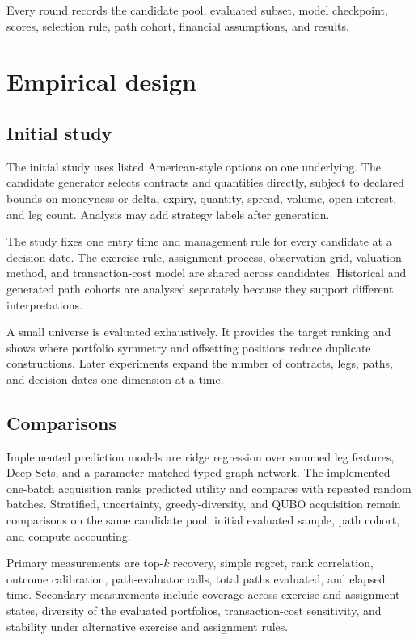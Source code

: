 \documentclass{strategynet-journal}
\begin{document}
Every round records the candidate pool, evaluated subset, model checkpoint,
scores, selection rule, path cohort, financial assumptions, and results.

\section{Empirical design}
\label{sec:experiment}

\begin{SNcolumns}

\subsection{Initial study}

The initial study uses listed American-style options on one underlying.  The
candidate generator selects contracts and quantities directly, subject to
declared bounds on moneyness or delta, expiry, quantity, spread, volume, open
interest, and leg count.  Analysis may add strategy labels after generation.

The study fixes one entry time and management rule for every candidate at a
decision date.  The exercise rule, assignment process, observation grid,
valuation method, and transaction-cost model are shared across candidates.
Historical and generated path cohorts are analysed separately because they
support different interpretations.

A small universe is evaluated exhaustively.  It provides the target ranking
and shows where portfolio symmetry and offsetting positions reduce duplicate
constructions.  Later experiments expand the number of contracts, legs, paths,
and decision dates one dimension at a time.

\subsection{Comparisons}

Implemented prediction models are ridge regression over summed leg features,
Deep Sets, and a parameter-matched typed graph network.  The implemented
one-batch acquisition ranks predicted utility and compares with repeated
random batches.  Stratified, uncertainty, greedy-diversity, and QUBO
acquisition remain comparisons on the same candidate pool, initial evaluated
sample, path cohort, and compute accounting.

Primary measurements are top-\(k\) recovery, simple regret, rank correlation,
outcome calibration, path-evaluator calls, total paths evaluated, and elapsed
time.  Secondary measurements include coverage across exercise and assignment
states, diversity of the evaluated portfolios, transaction-cost sensitivity,
and stability under alternative exercise and assignment rules.


\end{SNcolumns}
\end{document}

